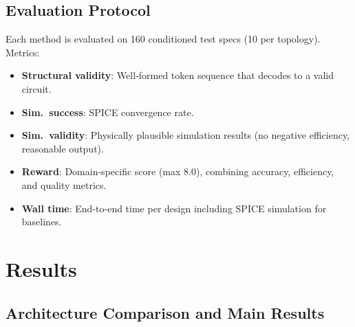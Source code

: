 \documentclass[conference]{IEEEtran}
\begin{document}
\subsection{Evaluation Protocol}

Each method is evaluated on 160 conditioned test specs (10 per
topology). Metrics:
\begin{itemize}
    \item \textbf{Structural validity}: Well-formed token sequence
    that decodes to a valid circuit.
    \item \textbf{Sim.\ success}: SPICE convergence rate.
    \item \textbf{Sim.\ validity}: Physically plausible simulation
    results (no negative efficiency, reasonable output).
    \item \textbf{Reward}: Domain-specific score (max 8.0), combining
    accuracy, efficiency, and quality metrics.
    \item \textbf{Wall time}: End-to-end time per design including
    SPICE simulation for baselines.
\end{itemize}

\section{Results}
\label{sec:results}

\subsection{Architecture Comparison and Main Results}
\end{document}
